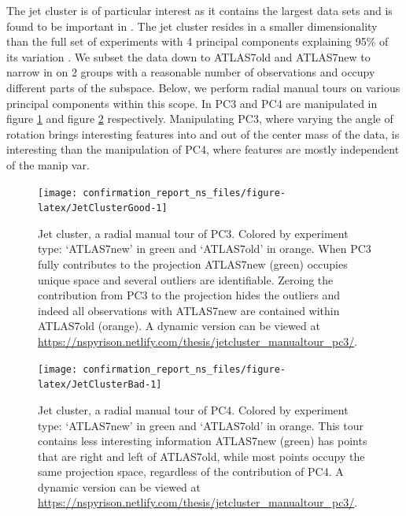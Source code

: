 \documentclass{monashthesis}
\begin{document}
The jet cluster is of particular interest as it contains the largest
data sets and is found to be important in
\textcite{wang_visualizing_2018}. The jet cluster resides in a smaller
dimensionality than the full set of experiments with 4 principal
components explaining 95\% of its variation
\autocite{cook_dynamical_2018}. We subset the data down to ATLAS7old and
ATLAS7new to narrow in on 2 groups with a reasonable number of
observations and occupy different parts of the subspace. Below, we
perform radial manual tours on various principal components within this
scope. In PC3 and PC4 are manipulated in figure \ref{fig:JetClusterGood}
and figure \ref{fig:JetClusterBad} respectively. Manipulating PC3, where
varying the angle of rotation brings interesting features into and out
of the center mass of the data, is interesting than the manipulation of
PC4, where features are mostly independent of the manip var.










\begin{figure}

{\centering \texttt{[image: confirmation\_report\_ns\_files/figure-latex/JetClusterGood-1]} 

}

\caption{Jet cluster, a radial manual tour of PC3.
Colored by experiment type: `ATLAS7new' in green and `ATLAS7old' in
orange. When PC3 fully contributes to the projection ATLAS7new (green)
occupies unique space and several outliers are identifiable. Zeroing the
contribution from PC3 to the projection hides the outliers and indeed
all observations with ATLAS7new are contained within ATLAS7old (orange).
A dynamic version can be viewed at
\url{https://nspyrison.netlify.com/thesis/jetcluster_manualtour_pc3/}.}\label{fig:JetClusterGood}
\end{figure}









\begin{figure}

{\centering \texttt{[image: confirmation\_report\_ns\_files/figure-latex/JetClusterBad-1]} 

}

\caption{Jet cluster, a radial manual tour of PC4.
Colored by experiment type: `ATLAS7new' in green and `ATLAS7old' in
orange. This tour contains less interesting information ATLAS7new
(green) has points that are right and left of ATLAS7old, while most
points occupy the same projection space, regardless of the contribution
of PC4. A dynamic version can be viewed at
\url{https://nspyrison.netlify.com/thesis/jetcluster_manualtour_pc3/}.}\label{fig:JetClusterBad}
\end{figure}
\end{document}
